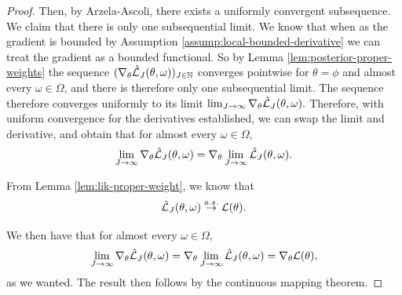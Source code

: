 \documentclass{article}
\begin{document}
\begin{proof}
    Then, by Arzela-Ascoli, there exists a uniformly convergent subsequence. We claim that there is only one subsequential limit. We know that when as the gradient is bounded by Assumption \ref{assump:local-bounded-derivative} we can treat the gradient as a bounded functional. So by Lemma \ref{lem:posterior-proper-weights} the sequence $(\nabla_\theta \hat{\mathcal{L}}_J(\theta, \omega))_{J \in \mathbb{N}}$ converges pointwise for $\theta=\phi$ and almost every $\omega \in \Omega$, and there is therefore only one subsequential limit. The sequence therefore converges uniformly to its limit $\lim_{J \to \infty} \nabla_\theta \hat{\mathcal{L}}_J(\theta, \omega).$ Therefore, with uniform convergence for the derivatives established, we can swap the limit and derivative, and obtain that for almost every $\omega \in \Omega$, 
    $$\lim_{J \to \infty} \nabla_\theta \hat{\mathcal{L}}_J(\theta, \omega) = \nabla_\theta \lim_{J \to \infty} \hat{\mathcal{L}}_J(\theta, \omega).$$

    From Lemma \ref{lem:lik-proper-weight}, we know that
    $$\hat{\mathcal{L}}_J(\theta, \omega) \stackrel{a.s.}{\to} \mathcal{L}(\theta).$$

    We then have that for almost every $\omega \in \Omega$, 
    $$\lim_{J \to \infty} \nabla_\theta \hat{\mathcal{L}}_J(\theta, \omega) = \nabla_\theta \lim_{J \to \infty} \hat{\mathcal{L}}_J(\theta, \omega) = \nabla_\theta \mathcal{L}(\theta),$$
    as we wanted. The result then follows by the continuous mapping theorem. 
    
    

    

    



    
    
\end{proof}
\end{document}
